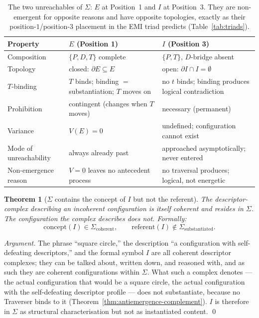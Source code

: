 \documentclass[11pt,a4paper]{article}
\newtheorem{theorem}{Theorem}[section]
\theoremstyle{definition}
\theoremstyle{remark}
\begin{document}
\begin{table}[h]
\centering
\begin{tabular}{@{}l >{\raggedright\arraybackslash}p{} >{\raggedright\arraybackslash}p{}@{}}
\toprule
Property & $E$ (Position 1) & $I$ (Position 3) \\
\midrule
Composition & $\{P,D,T\}$ complete & $\{P,T\}$, $D$-bridge absent\\
Topology & closed: $\partial E \subseteq E$ & open: $\partial I \cap I = \emptyset$\\
$T$-binding & $T$ binds; binding $=$ substantiation; $T$ moves on & no $t$ binds; binding produces logical contradiction\\
Prohibition & contingent (changes when $T$ moves) & necessary (permanent)\\
Variance & $V(E) = 0$ & undefined; configuration cannot exist\\
Mode of unreachability & always already past & approached asymptotically; never entered\\
Non-emergence reason & $V=0$ leaves no antecedent process & no traversal produces; logical, not energetic\\
\bottomrule
\end{tabular}
\caption{The two unreachables of $\Sigma$: $E$ at Position~1 and $I$ at Position~3. They are non-emergent for opposite reasons and have opposite topologies, exactly as their position-$1$/position-$3$ placement in the EMI triad predicts (Table~\ref{tab:triads}).}
\label{tab:two-unreachables}
\end{table}

\begin{theorem}[$\Sigma$ contains the concept of $I$ but not the referent]\label{thm:I-concept-not-referent}
The descriptor-complex describing an incoherent configuration is itself coherent and resides in $\Sigma$. The configuration the complex describes does not. Formally:
\[
\mathrm{concept}(I) \in \Sigma_{\mathrm{coherent}}, \qquad \mathrm{referent}(I) \notin \Sigma_{\mathrm{substantiated}}.
\]
\end{theorem}

\begin{proof}[Argument]
The phrase ``square circle,'' the description ``a configuration with self-defeating descriptors,'' and the formal symbol $I$ are all coherent descriptor complexes; they can be talked about, written down, and reasoned with, and as such they are coherent configurations within $\Sigma$. What such a complex denotes --- the actual configuration that would be a square circle, the actual configuration with the self-defeating descriptor profile --- does not substantiate, because no Traverser binds to it (Theorem~\ref{thm:antiemergence-complement}). $I$ is therefore in $\Sigma$ as structural characterisation but not as instantiated content. \qed
\end{proof}
\end{document}
